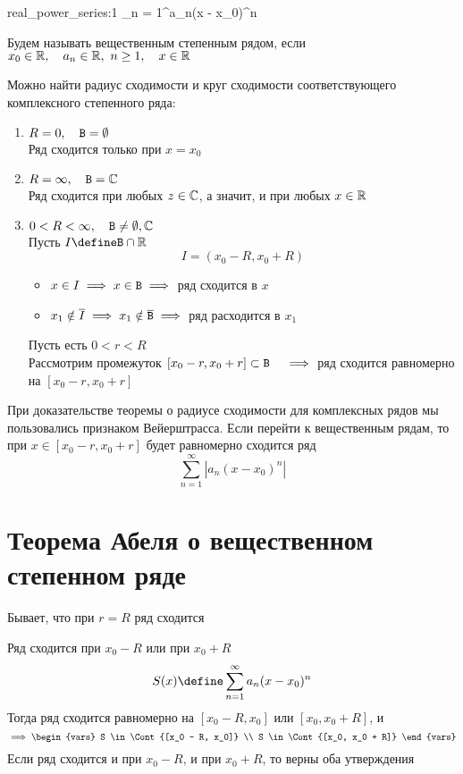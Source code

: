 \begin{definition}
	\begin{equ}{real_power_series:1}
		\sum_{n = 1}^\infty a_n(x - x_0)^n
	\end{equ}
	Будем называть  вещественным степенным рядом, если $ x_0 \in \mathbb{R}, \quad a_n \in \mathbb{R}, ~ n \ge 1, \quad x \in \mathbb{R} $
\end{definition}

Можно найти радиус сходимости и круг сходимости соответствующего комплексного степенного ряда:

\begin{enumerate}
	\item $ R = 0, \quad \mathtt{B} = \emptyset $ \\
	Ряд сходится только при $ x = x_0 $
	\item $ R = \infty, \quad \mathtt{B} = \mathbb{C} $ \\
	Ряд сходится при любых $ z \in \mathbb{C} $, а значит, и при любых $ x \in \mathbb{R} $
	\item $ 0 < R < \infty, \quad \mathtt{B} \ne \emptyset, \mathbb{C} $ \\
	Пусть $ I \define \B \cap \R $
	$$ I = (x_0 - R, x_0 + R) $$
	\begin{itemize}
		\item $ x \in I \implies x \in \mathtt{B} \implies $ ряд сходится в $ x $
		\item $ x_1 \notin \overline I \implies x_1 \notin \overline{\mathtt{B}} \implies $ ряд расходится в $ x_1 $
	\end{itemize}
	Пусть есть $ 0 < r < R $ \\
	Рассмотрим промежуток $ [x_0 - r, x_0 + r] \subset \mathtt{B} \quad \implies $ ряд сходится равномерно на $ [x_0 - r, x_0 + r] $
\end{enumerate}

При доказательстве теоремы о радиусе сходимости для комплексных рядов мы пользовались признаком Вейерштрасса. Если перейти к вещественным рядам, то при $ x \in [x_0 - r, x_0 + r] $ будет равномерно сходится ряд
$$ \sum_{n = 1}^\infty |a_n(x - x_0)^n| $$

\section{Теорема Абеля о вещественном степенном ряде}

Бывает, что при $ r = R $ ряд сходится

\begin{theorem}[Абеля]
	Ряд  сходится при $ x_0 - R $ или при $ x_0 + R $
	$$ S(x) \define \sum_{n = 1}^\infty a_n(x - x_0)^n $$
	Тогда ряд сходится равномерно на $ [x_0 - R, x_0] $ или $ [x_0, x_0 + R] $, и
	$$ \implies
	\begin{vars}
		S \in \Cont{[x_0 - R, x_0]} \\
		S \in \Cont{[x_0, x_0 + R]}
	\end{vars} $$
	Если ряд сходится и при $ x_0 - R $, и при $ x_0 + R $, то верны оба утверждения
\end{theorem}

